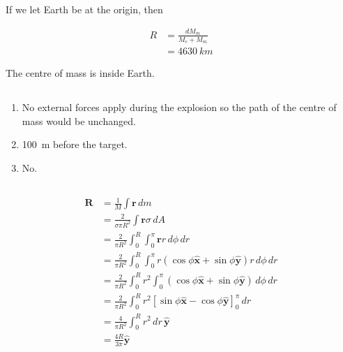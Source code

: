 \documentclass{article}
\renewcommand{\vec}[1]{\boldsymbol{\mathbf{#1}}}
\newcommand{\uvec}[1]{\hat{\vec{#1}}}
\begin{document}
\setcounter{subsection}{16}
\subsection{}

If we let Earth be at the origin, then

\begin{align*}
  R & = \frac{d M_m}{M_e + M_m} \\
    & = \qty{4630}{km}
\end{align*}

The centre of mass is inside Earth.

\setcounter{subsection}{18}
\subsection{}

\begin{enumerate}
  \item No external forces apply during the explosion so the path of the centre of mass would be unchanged.

  \item \qty{100}{m} before the target.

  \item No.
\end{enumerate}

\setcounter{subsection}{20}
\subsection{}

\begin{align*}
  \vec{R} & = \frac{1}{M} \int \vec{r} \,d m                                                                     \\
          & = \frac{2}{\sigma \pi R^2} \int \vec{r} \sigma \,d A                                                 \\
          & = \frac{2}{\pi R^2} \int_0^R \int_0^\pi \vec{r} r \,d \phi \,d r                                     \\
          & = \frac{2}{\pi R^2} \int_0^R \int_0^\pi r (\cos \phi \uvec{x} + \sin \phi \uvec{y}) r \,d \phi \,d r \\
          & = \frac{2}{\pi R^2} \int_0^R r^2 \int_0^\pi (\cos \phi \uvec{x} + \sin \phi \uvec{y}) \,d \phi \,d r \\
          & = \frac{2}{\pi R^2} \int_0^R r^2 [\sin \phi \uvec{x} - \cos \phi \uvec{y}]_0^\pi \,d r               \\
          & = \frac{4}{\pi R^2} \int_0^R r^2 \,d r \,\uvec{y}                                                    \\
          & = \frac{4 R}{3 \pi} \uvec{y}
\end{align*}
\end{document}
